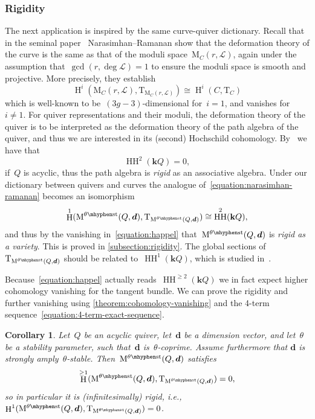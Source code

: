 \documentclass[11pt]{article}
\theoremstyle{plain}
\newtheorem{alphacorollary}[alphatheorem]{Corollary}
\theoremstyle{definition}
\DeclareMathOperator\HH{H}
\DeclareMathOperator\hochschild{HH}
\newcommand\field{\mathbf{k}}
\newcommand\stable{\ensuremath{\mhyphen\mathrm{st}}}
\newcommand\tangent{\ensuremath{\mathrm{T}}}
\newcommand\tuple[1]{\ensuremath{{\boldsymbol{#1}}}}
\begin{document}
\subsubsection*{Rigidity}
The next application is inspired by the same curve-quiver dictionary.
Recall that in the seminal paper~\cite{MR0384797} Narasimhan--Ramanan show
that the deformation theory of the curve
is the same as that of the moduli space~$\mathrm{M}_C(r,\mathcal{L})$,
again under the assumption that~$\gcd(r,\deg\mathcal{L})=1$ to ensure the moduli space is smooth and projective.
More precisely,
they establish
\begin{equation}
\label{equation:narasimhan-ramanan}
\HH^i(\mathrm{M}_C(r,\mathcal{L}),\tangent_{\mathrm{M}_C(r,\mathcal{L})})
\cong
\HH^i(C,\tangent_C)
\end{equation}
which is well-known to be~$(3g-3)$-dimensional for~$i=1$,
and vanishes for~$i\neq 1$.
For quiver representations and their moduli,
the deformation theory of the quiver
is to be interpreted as the deformation theory of the path algebra of the quiver,
and thus we are interested in its (second) Hochschild cohomology.
By~\cite[\S1.6]{MR1035222} we have that
\begin{equation}
\label{equation:happel}
\hochschild^2(\field Q)=0,
\end{equation}
if~$Q$ is acyclic,
thus the path algebra is \emph{rigid} as an associative algebra.
Under our dictionary between quivers and curves
the analogue of~\eqref{equation:narasimhan-ramanan}
becomes an isomorphism
\begin{equation*}
\HH^1(\modulispace[\theta\stable]{Q,\tuple{d}},\tangent_{\modulispace[\theta\stable]{Q,\tuple{d}}})
\cong
\hochschild^2(\field Q),
\end{equation*}
and thus by the vanishing in~\eqref{equation:happel}
that~$\modulispace[\theta\stable]{Q,\tuple{d}}$
is \emph{rigid as a variety}.
This is proved in \cref{subsection:rigidity}.
The global sections of~$\tangent_{\modulispace[\theta\stable]{Q,\tuple{d}}}$
should be related to~$\hochschild^1(\field Q)$,
which is studied in~\cite{MR4883104}.

Because~\eqref{equation:happel} actually reads~$\hochschild^{\geq 2}(\field Q)$
we in fact expect higher cohomology vanishing for the tangent bundle.
We can prove the rigidity and further vanishing using \cref{theorem:cohomology-vanishing}
and the 4-term sequence~\eqref{equation:4-term-exact-sequence}.

\begin{alphacorollary}
\label{corollary:rigidity}
Let~$Q$ be an acyclic quiver,
let~$\tuple{d}$ be a dimension vector,
and let~$\theta$ be a stability parameter,
such that~$\tuple{d}$ is~$\theta$-coprime.
Assume furthermore that $\tuple{d}$ is strongly amply~$\theta$-stable.
Then~$\modulispace[\theta\stable]{Q,\tuple{d}}$ satisfies
\begin{equation*}
\HH^{\geq 1}(\modulispace[\theta\stable]{Q,\tuple{d}},\tangent_{\modulispace[\theta\stable]{Q,\tuple{d}}})=0,
\end{equation*}
so in particular it is (infinitesimally) rigid,
i.e.,~$\HH^1(\modulispace[\theta\stable]{Q,\tuple{d}},\tangent_{\modulispace[\theta\stable]{Q,\tuple{d}}})=0$.
\end{alphacorollary}
\end{document}
